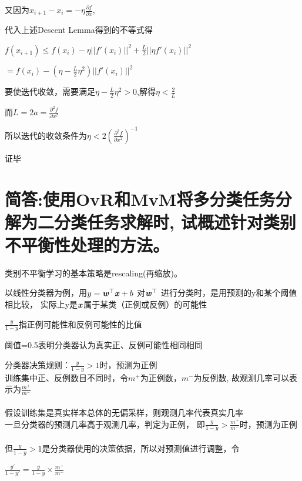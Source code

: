 \documentclass[UTF8]{ctexart}
\begin{document}
又因为$\displaystyle{x_{i+1}-x_{i}=-\eta \frac{ \partial f }{ \partial x }}$,

代入上述Descent Lemma得到的不等式得

\begin{center}
    $f(x_{i+1}) \leq f(x_i)-\eta ||f'(x_i) ||^2+\frac{L}{2}||\eta f'(x_i)||^2$

    $=f(x_i)-(\eta-\frac{L}{2}\eta^2)||f'(x_i) ||^2$
\end{center}

要使迭代收敛，需要满足$\eta-\frac{L}{2}\eta^2>0$,解得$\displaystyle{\eta <\frac{2}{L}}$

而$\displaystyle{L=2a=\frac{ \partial ^{2}f }{ \partial x ^{2}}}$

所以迭代的收敛条件为$\displaystyle{\eta < 2\left(\frac{ \partial ^{2}f }{ \partial x ^{2}}\right)^{-1}}$

证毕
\section{简答:使用OvR和MvM将多分类任务分解为二分类任务求解时,
  试概述针对类别不平衡性处理的方法。}
类别不平衡学习的基本策略是rescaling(再缩放)。

以线性分类器为例，用$y=\mathbf{\textbf {\emph{w}}} ^\top \textbf {\emph{x}}+b$
对$\mathbf{\textbf {\emph{w}}} ^\top$
进行分类时，是用预测的y和某个阈值相比较，
实际上y是$\textbf {\emph{x}}$属于某类（正例或反例）的可能性

$\displaystyle{\frac{y}{1-y}}$指正例可能性和反例可能性的比值

阈值=0.5表明分类器认为真实正、反例可能性相同相同

分类器决策规则：$\displaystyle{\frac{y}{1-y}}>1$时，预测为正例
\\
训练集中正、反例数目不同时，令$m^+$为正例数，$m^-$为反例数,
故观测几率可以表示为$\displaystyle{\frac{m^+}{m^-}}$\\
\\
假设训练集是真实样本总体的无偏采样，则观测几率代表真实几率\\
一旦分类器的预测几率高于观测几率，判定为正例，
即$\displaystyle{\frac{y}{1-y}>\frac{m^+}{m^-}}$时，预测为正例\\
\\
但$\displaystyle{\frac{y}{1-y}}>1$是分类器使用的决策依据，所以对预测值进行调整，令

\begin{center}
    $\displaystyle{\frac{y'}{1-y'}=\frac{y}{1-y}×\frac{m^+}{m^-}}$
\end{center}
\end{document}
